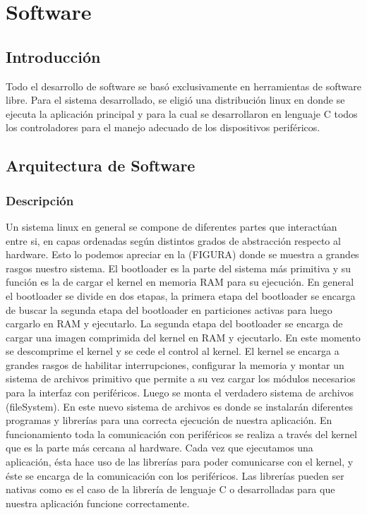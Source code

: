 \chapter{Software}

\section{Introducción}
Todo el desarrollo de software se basó exclusivamente en herramientas de software libre. Para el sistema desarrollado, se eligió una distribución linux en donde se ejecuta la aplicación principal y para la cual se desarrollaron en lenguaje C todos los controladores para el manejo adecuado de los dispositivos periféricos.

\section{Arquitectura de Software}
\subsection{Descripción}
Un sistema linux en general se compone de diferentes partes que interactúan entre si, en capas ordenadas según distintos grados de abstracción respecto al hardware. Esto lo podemos apreciar en la (FIGURA) donde se muestra a grandes rasgos nuestro sistema. 
El bootloader es la parte del sistema más primitiva y su función es la de cargar el kernel en memoria RAM para su ejecución. En general el bootloader se divide en dos etapas, la primera etapa del bootloader se encarga de buscar la segunda etapa del bootloader en particiones activas para luego cargarlo en RAM y ejecutarlo. La segunda etapa del bootloader se encarga de cargar una imagen comprimida del kernel en RAM y ejecutarlo. En este momento se descomprime el kernel y se cede el control al kernel.
El kernel se encarga a grandes rasgos de habilitar interrupciones, configurar la memoria y montar un sistema de archivos primitivo que permite a su vez cargar los módulos necesarios para la interfaz con periféricos. Luego se monta el verdadero sistema de archivos (fileSystem). En este nuevo sistema de archivos es donde se instalarán diferentes programas y librerías para una correcta ejecución de nuestra aplicación.
En funcionamiento toda la comunicación con periféricos se realiza a través del kernel que es la parte más cercana al hardware.
Cada vez que ejecutamos una aplicación, ésta hace uso de las librerías 
para poder comunicarse con el kernel, y éste se encarga de la comunicación con los periféricos. Las librerías pueden ser nativas como es el caso de la librería de lenguaje C o desarrolladas para que nuestra aplicación funcione correctamente.

